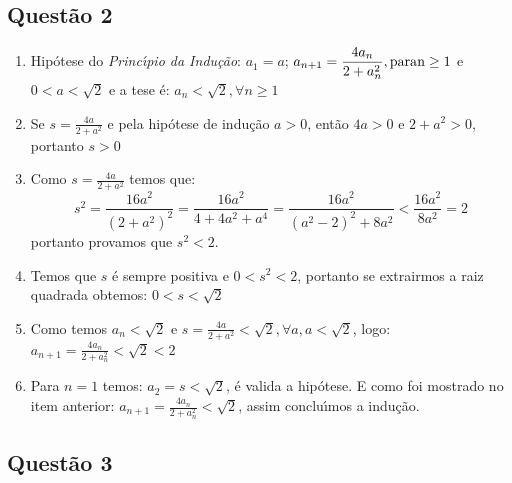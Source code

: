 \documentclass{report}
\begin{document}
\subsection{\color{red} Quest\~ao 2}

\begin{enumerate}

\item[(a)] Hip\'otese do {\it Princ\'\i pio da Indu\c c\~ao}: $a_1=a$; $\displaystyle a_{n+1}  = \frac{4a_n}{2+a_n^2}, \rm{para } n\geq 1$ e $0<a<\sqrt{2}$ e a tese \'e: $a_n<\sqrt{2}, \forall n\geq 1$

\item[(b)] Se $\displaystyle s=\frac{4a}{2+a^2}$ e pela hip\'otese de indu\c c\~ao $a>0$, ent\~ao $4a>0$ e $2+a^2>0$, portanto $s>0$

\item[(c)] Como $\displaystyle s=\frac{4a}{2+a^2}$ temos que: $$s^2=\frac{16a^2}{(2+a^2)^2}=\frac{16a^2}{4+4a^2+a^4}=\frac{16a^2}{(a^2-2)^2+8a^2}<\frac{16a^2}{8a^2}=2$$ portanto provamos que $s^2<2$.

\item[(d)] Temos que $s$ \'e sempre positiva e $0<s^2<2$, portanto se extrairmos a raiz quadrada obtemos: $0<s<\sqrt{2}$

\item[(e)] Como temos $a_n<\sqrt 2$ e $s=\displaystyle \frac{4a}{2+a^2}<\sqrt 2, \forall a, a<\sqrt 2$, logo: $a_{n+1}=\displaystyle \frac{4a_n}{2+a_n^2}<\sqrt 2<2$

\item[(f)] Para $n=1$ temos: $a_2=s<\sqrt 2$, \'e valida a hip\'otese. E como foi mostrado no item anterior: $a_{n+1}=\displaystyle \frac{4a_n}{2+a_n^2}<\sqrt 2$, assim conclu\'\i mos a indu\c c\~ao.

\end{enumerate}

\subsection{\color{red} Quest\~ao 3}
\end{document}
